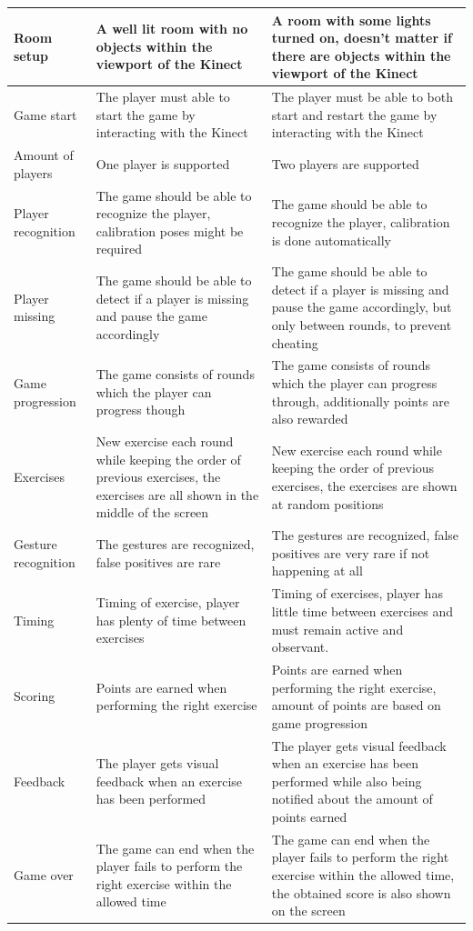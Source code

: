 \documentclass[11pt]{report}
\begin{document}
\begin{center}
\begin{longtable}{| p{3cm} | p{4.75cm} | p{6cm} | }
\hline
Room setup & A well lit room with no objects within the viewport of the Kinect & A room with some lights turned on, doesn't matter if there are objects within the viewport of the Kinect \\ \hline
Game start & The player must able to start the game by interacting with the Kinect & The player must be able to both start and restart the game by interacting with the Kinect \\ \hline
Amount of players & One player is supported & Two players are supported \\ \hline
Player recognition & The game should be able to recognize the player, calibration poses might be required & The game should be able to recognize the player, calibration is done automatically \\ \hline
Player missing & The game should be able to detect if a player is missing and pause the game accordingly & The game should be able to detect if a player is missing and pause the game accordingly, but only between rounds, to prevent cheating \\ \hline
Game progression & The game consists of rounds which the player can progress though & The game consists of rounds which the player can progress through, additionally points are also rewarded \\ \hline
Exercises & New exercise each round while keeping the order of previous exercises, the exercises are all shown in the middle of the screen & New exercise each round while keeping the order of previous exercises, the exercises are shown at random positions \\ \hline
Gesture recognition & The gestures are recognized, false positives are rare & The gestures are recognized, false positives are very rare if not happening at all \\ \hline
Timing & Timing of exercise, player has plenty of time between exercises & Timing of exercises, player has little time between exercises and must remain active and observant. \\ \hline
Scoring & Points are earned when performing the right exercise & Points are earned when performing the right exercise, amount of points are based on game progression \\ \hline
Feedback & The player gets visual feedback when an exercise has been performed & The player gets visual feedback when an exercise has been performed while also being notified about the amount of points earned \\ \hline
Game over & The game can end when the player fails to perform the right exercise within the allowed time & The game can end when the player fails to perform the right exercise within the allowed time, the obtained score is also shown on the screen \\ \hline
\end{longtable}
\end{center}
\end{document}
